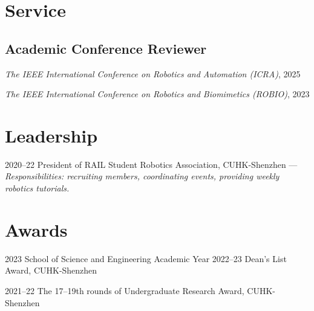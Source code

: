 \documentclass[11pt,letterpaper]{report}
\newcommand{\listitemspace}{0.25em}
\renewenvironment{itemize}
{\begin{list}{}{\setlength{\leftmargin}{0em}
			\setlength{\parskip}{0em}
			\setlength{\itemsep}{\listitemspace}
			\setlength{\parsep}{\listitemspace}}}
	{\end{list}}
\begin{document}
\section*{Service}
\subsection*{Academic Conference Reviewer}
\begin{itemize}
	\item \textit{The IEEE International Conference on Robotics and Automation (ICRA)}, 2025
	\item \textit{The IEEE International Conference on Robotics and Biomimetics (ROBIO)}, 2023 
\end{itemize}
	
	
\section*{Leadership}
\begin{tablist}
	\item[2020--22]   \tab President of RAIL Student Robotics Association, CUHK-Shenzhen --- \textit{Responsibilities: recruiting members, coordinating events, providing weekly robotics tutorials.}
\end{tablist}
	
\section*{Awards}
\begin{tablist}
	\item[2023]   \tab School of Science and Engineering Academic Year 2022--23 Dean's List Award, CUHK-Shenzhen
	\item[2021--22]   \tab The 17--19th rounds of  Undergraduate Research Award, CUHK-Shenzhen
\end{tablist}
	
\end{document}
